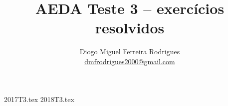 \documentclass{aeda_test}
\title{AEDA Teste 3 -- exercícios resolvidos}
\author{Diogo Miguel Ferreira Rodrigues \\ \href{mailto:dmfrodrigues2000@gmail.com}{dmfrodrigues2000@gmail.com}}
\date{}
\begin{document}
\begingroup
\maketitle
	\let\clearpage\relax
	\tableofcontents
\endgroup
{2017T3.tex}
{2018T3.tex}
\end{document}
